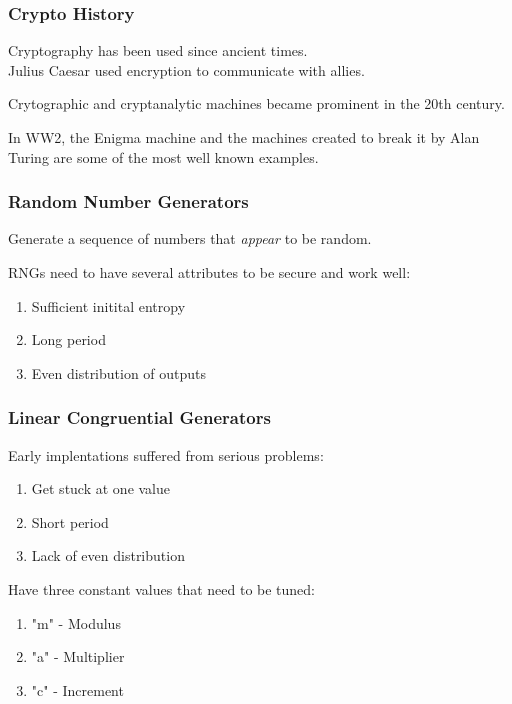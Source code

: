 \documentclass{beamer}
\begin{document}

  \begin{frame}
    \frametitle{Crypto History}

    Cryptography has been used since ancient times. \\
    Julius Caesar used encryption to communicate with allies.
    
    \vfill

    Crytographic and cryptanalytic machines became prominent in the 20th century.
    
    \vfill
    
    In WW2, the Enigma machine and the machines created to break it by Alan Turing
    are some of the most well known examples.

  \end{frame}

  \begin{frame}
    \frametitle{Random Number Generators}

    Generate a sequence of numbers that \textit{appear} to be random.

    \vfill

    RNGs need to have several attributes to be secure and work well:
    
    \begin{enumerate}
      \item Sufficient initital entropy
      \item Long period
      \item Even distribution of outputs
    \end{enumerate}
    
  \end{frame}
  
  \begin{frame}
    \frametitle{Linear Congruential Generators}

    Early implentations suffered from serious problems:
    \begin{enumerate}
        \item Get stuck at one value
        \item Short period
        \item Lack of even distribution
    \end{enumerate}

    \vfill

    Have three constant values that need to be tuned:
    \begin{enumerate}
        \item "m" - Modulus
        \item "a" - Multiplier
        \item "c" - Increment
    \end{enumerate}
    
    
  \end{frame}
  
\end{document}
